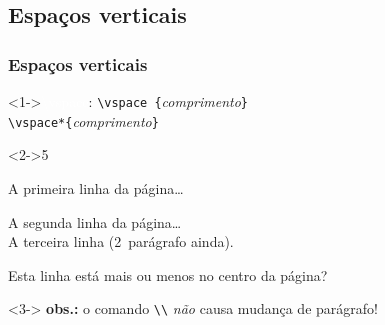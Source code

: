 \documentclass[handout,10pt]{beamer}
\begin{document}
\subsection{Espaços verticais}
\begin{frame}[fragile]
	\frametitle{Espaços verticais}
	
	\begin{block}<1->{\textcolor{white}{\textbackslash vspace}: }
		\centering
		\verb|\vspace {|\textit{comprimento}\verb|}|\\
		\verb|\vspace*{|\textit{comprimento}\verb|}|
	\end{block}
	
	
	\begin{atividade}<2->{5}
		\begin{LaTeXcode}
			A primeira linha da página\dots
			
			\vspace{1cm}
			
			A segunda linha da página\dots\\[1cm]
			A terceira linha (2\textordmasculine\ parágrafo ainda).
			
			\newpage %
	
			\vspace{10cm} %
			Esta linha está mais ou menos no centro da página?
		\end{LaTeXcode}
	\end{atividade}
	
	
	\begin{center}
		\begin{uncoverenv}<3->
			\textbf{obs.:} o comando \verb|\\| \emph{não} causa mudança de parágrafo!
		\end{uncoverenv}
	\end{center}			
\end{frame}
\end{document}

